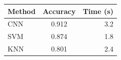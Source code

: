 \begin{table}[htbp]
\centering
\begin{tabular}{lcr}
\toprule
Method & Accuracy & Time (s) \\
\midrule
CNN & 0.912 & 3.2 \\
SVM & 0.874 & 1.8 \\
KNN & 0.801 & 2.4 \\
\bottomrule
\end{tabular}
\end{table}
